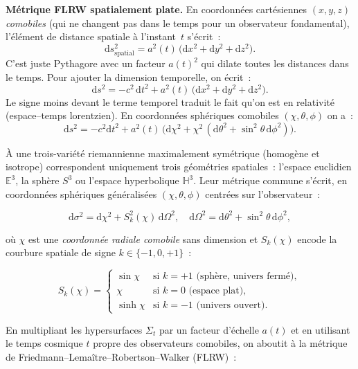\documentclass[11pt,a4paper,openany]{report}
\newcommand{\dif}{\mathrm{d}}
\begin{document}
\begin{tcolorbox}[mathspe]
\textbf{Métrique FLRW spatialement plate.} En coordonnées cartésiennes
$(x,y,z)$ \emph{comobiles} (qui ne changent pas dans le temps pour un
observateur fondamental), l'élément de distance spatiale à l'instant~$t$
s'écrit~:
\[
\dif s^{2}_{\text{spatial}} = a^{2}(t)\,\bigl(\dif x^{2} + \dif y^{2} + \dif z^{2}\bigr).
\]
C'est juste Pythagore avec un facteur $a(t)^{2}$ qui dilate toutes les
distances dans le temps. Pour ajouter la dimension temporelle, on écrit~:
\[
\dif s^{2} = -c^{2}\,\dif t^{2} + a^{2}(t)\,\bigl(\dif x^{2} + \dif y^{2} + \dif z^{2}\bigr).
\]
Le signe moins devant le terme temporel traduit le fait qu'on est en
relativité (espace--temps lorentzien). En coordonnées sphériques comobiles
$(\chi, \theta, \phi)$ on a~:
\[
\dif s^{2} = -c^{2}\dif t^{2} + a^{2}(t)\,\bigl(\dif\chi^{2}
+ \chi^{2}\,(\dif\theta^{2} + \sin^{2}\theta\,\dif\phi^{2})\bigr).
\]
\end{tcolorbox}

À une trois-variété riemannienne maximalement symétrique (homogène et isotrope)
correspondent uniquement trois géométries spatiales~: l'espace euclidien
$\mathbb{E}^{3}$, la sphère $S^{3}$ ou l'espace hyperbolique $\mathbb{H}^{3}$.
Leur métrique commune s'écrit, en coordonnées sphériques généralisées
$(\chi,\theta,\phi)$ centrées sur l'observateur~:

\begin{equation}
\dif\sigma^{2} = \dif\chi^{2} + S_{k}^{2}(\chi)\,\dif\Omega^{2},
\quad \dif\Omega^{2} = \dif\theta^{2} + \sin^{2}\theta\,\dif\phi^{2},
\label{eq:dsigma}
\end{equation}

\noindent où $\chi$ est une \emph{coordonnée radiale comobile} sans dimension
et $S_{k}(\chi)$ encode la courbure spatiale de signe $k\in\{-1,0,+1\}$~:

\begin{equation}
S_{k}(\chi) =
\begin{cases}
\sin\chi      & \text{si } k=+1 \text{ (sphère, univers fermé)},\\
\chi          & \text{si } k=0 \text{ (espace plat)},\\
\sinh\chi     & \text{si } k=-1 \text{ (univers ouvert)}.
\end{cases}
\label{eq:Sk}
\end{equation}

\noindent En multipliant les hypersurfaces $\Sigma_t$ par un facteur d'échelle
$a(t)$ et en utilisant le temps cosmique $t$ propre des observateurs comobiles,
on aboutit à la métrique de Friedmann--Lemaître--Robertson--Walker (FLRW)~:
\end{document}
